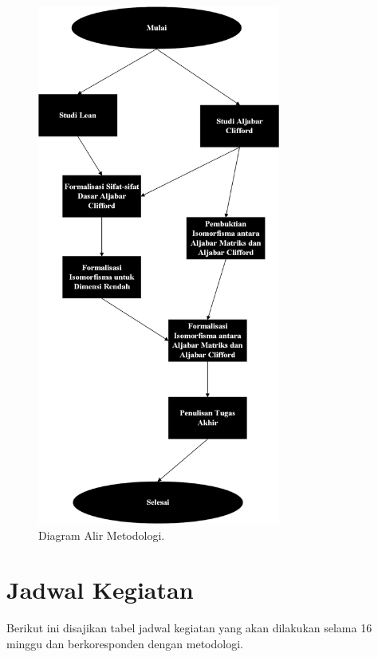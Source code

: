 \begin{figure}[H]
	\centering
	\includegraphics[width=8cm]{foto/BlockDiagram.png}
	\caption{Diagram Alir Metodologi.}
	\label{diagramalir}
\end{figure}

\section{Jadwal Kegiatan}
Berikut ini disajikan tabel jadwal kegiatan yang akan dilakukan selama 16 minggu dan berkoresponden dengan metodologi.\vspace{0.5cm}

